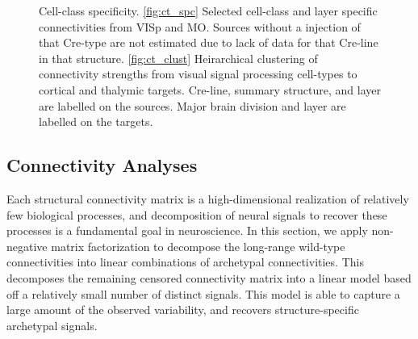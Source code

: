 \begin{figure}[H]
    \newline
    
    \caption{  Cell-class specificity. \ref{fig:ct_spc} Selected cell-class and layer specific connectivities from VISp and MO.
	 Sources without a injection of that Cre-type are not estimated due to lack of data for that Cre-line in that structure.
    		\ref{fig:ct_clust}
		Heirarchical clustering of connectivity strengths from visual signal processing cell-types to cortical and thalymic targets.
		Cre-line, summary structure, and layer are labelled on the sources.
		Major brain division and layer are labelled on the targets.}
\label{fig:data_ct}
\end{figure}

\newpage

\subsection{Connectivity Analyses}

Each structural connectivity matrix is a high-dimensional realization of relatively few biological processes, and decomposition of neural signals to recover these processes is a fundamental goal in neuroscience.
In this section, we apply non-negative matrix factorization to decompose the long-range wild-type connectivities into linear combinations of archetypal connectivities.
This decomposes the remaining censored connectivity matrix into a linear model based off a relatively small number of distinct signals.
This model is able to capture a large amount of the observed variability, and recovers structure-specific archetypal signals.

